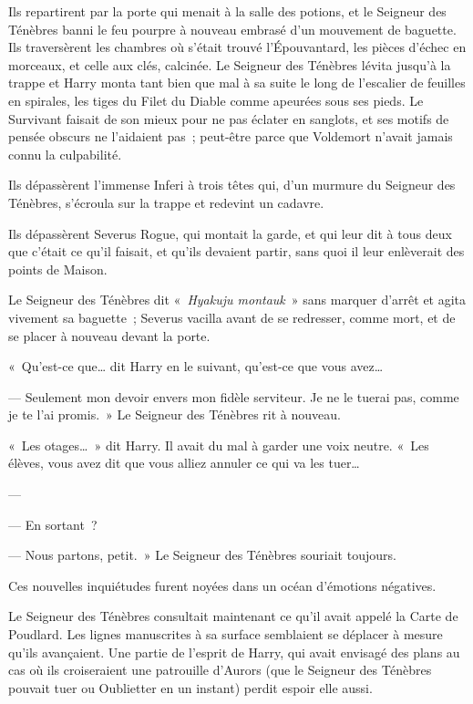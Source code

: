 Ils repartirent par la porte qui menait à la salle des potions, et le Seigneur des Ténèbres banni le feu pourpre à nouveau embrasé d'un mouvement de baguette.
Ils traversèrent les chambres où s'était trouvé l'Épouvantard, les pièces d'échec en morceaux, et celle aux clés, calcinée.
Le Seigneur des Ténèbres lévita jusqu'à la trappe et Harry monta tant bien que mal à sa suite le long de l'escalier de feuilles en spirales, les tiges du Filet du Diable comme apeurées sous ses pieds.
Le Survivant faisait de son mieux pour ne pas éclater en sanglots, et ses motifs de pensée obscurs ne l'aidaient pas~; peut-être parce que Voldemort n'avait jamais connu la culpabilité.

Ils dépassèrent l'immense Inferi à trois têtes qui, d'un murmure du Seigneur des Ténèbres, s'écroula sur la trappe et redevint un cadavre.

Ils dépassèrent Severus Rogue, qui montait la garde, et qui leur dit à tous deux que c'était ce qu'il faisait, et qu'ils devaient partir, sans quoi il leur enlèverait des points de Maison.

Le Seigneur des Ténèbres dit «~\emph{Hyakuju montauk}~» sans marquer d'arrêt et agita vivement sa baguette~; Severus vacilla avant de se redresser, comme mort, et de se placer à nouveau devant la porte.

«~Qu'est-ce que… dit Harry en le suivant, qu'est-ce que vous avez…

--- Seulement mon devoir envers mon fidèle serviteur.
Je ne le tuerai pas, comme je te l'ai promis.~»
Le Seigneur des Ténèbres rit à nouveau.

«~Les otages…~»
dit Harry.
Il avait du mal à garder une voix neutre.
«~Les élèves, vous avez dit que vous alliez annuler ce qui va les tuer…

--- 

--- En sortant~?

--- Nous partons, petit.~»
Le Seigneur des Ténèbres souriait toujours.

Ces nouvelles inquiétudes furent noyées dans un océan d'émotions négatives.

Le Seigneur des Ténèbres consultait maintenant ce qu'il avait appelé la Carte de Poudlard.
Les lignes manuscrites à sa surface semblaient se déplacer à mesure qu'ils avançaient.
Une partie de l'esprit de Harry, qui avait envisagé des plans au cas où ils croiseraient une patrouille d'Aurors (que le Seigneur des Ténèbres pouvait tuer ou Oublietter en un instant) perdit espoir elle aussi.

